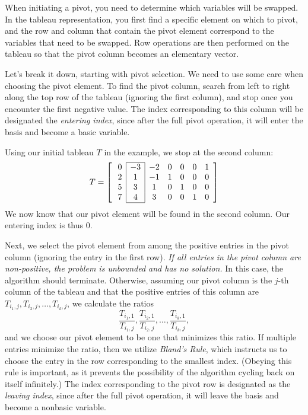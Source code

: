 When initiating a pivot, you need to determine which variables will be swapped.
In the tableau representation, you first find a specific element on which to pivot, and the row and column that contain the pivot
element correspond to the variables that need to be swapped.
Row operations are then performed on the tableau so that the pivot column becomes an elementary vector.

Let's break it down, starting with pivot selection. We need to use some care when choosing the pivot element. 
To find the pivot column, search from left to right along the top row of the tableau
(ignoring the first column), and stop once you encounter the first negative value. The index corresponding
to this column will be designated the \emph{entering index}, since after the full pivot operation, it will enter
the basis and become a basic variable.

Using our initial tableau $T$ in the example, we stop at the second column:
\[ T = \left[ \:
\begin{array}{*{7}{c}}
\cline{2-2}
0 & \multicolumn{1}{|c}{-3} & \multicolumn{1}{|c}{-2} & 0 & 0 & 0 & 1\\
2 & \multicolumn{1}{|c}{1} & \multicolumn{1}{|c}{-1} & 1 & 0 & 0 & 0\\
5 & \multicolumn{1}{|c}{3} & \multicolumn{1}{|c}{1} & 0 & 1 & 0 & 0\\
7 & \multicolumn{1}{|c}{4} & \multicolumn{1}{|c}{3} & 0 & 0 & 1 & 0\\
\cline{2-2}
\end{array}
\right] \]
We now know that our pivot element will be found in the second column. Our entering index is thus $0$.

Next, we select the pivot element from among the positive entries in the pivot column (ignoring the entry in the first row).
\emph{If all entries in the pivot column are non-positive, the problem is unbounded and has no solution.} In this case, the algorithm
should terminate.
Otherwise, assuming our pivot column is the $j$-th column of the tableau and that the positive entries of this column are
$T_{i_1, j}, T_{i_2, j}, \ldots, T_{i_k, j}$, we calculate the ratios
\[
\frac{T_{i_1,1}}{T_{i_1,j}}, \frac{T_{i_2,1}}{T_{i_2,j}}, \ldots, \frac{T_{i_k,1}}{T_{i_k,j}},
\]
and we choose our pivot element to be one that minimizes this ratio. If multiple entries minimize the ratio, then we utilize
\emph{Bland's Rule}, which instructs us to choose the entry in the row corresponding to the smallest index.
(Obeying this rule is important, as it prevents the possibility of the algorithm cycling back on itself infinitely.) 
The index corresponding to the pivot row is designated as the \emph{leaving index}, since after the full pivot operation,
it will leave the basis and become a nonbasic variable.

